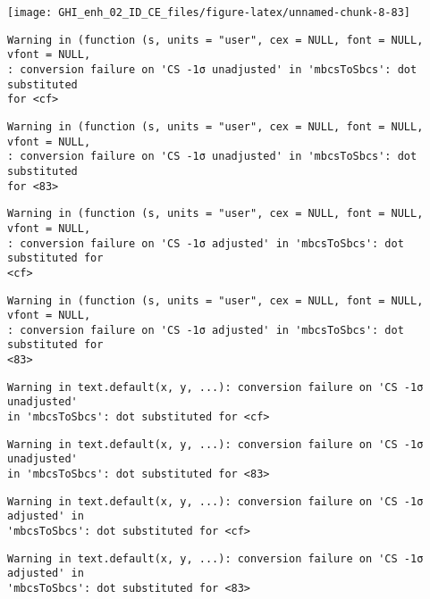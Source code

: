 \documentclass[
  10pt,
  a4paper,oneside]{article}
\begin{document}
\begin{center}\texttt{[image: GHI\_enh\_02\_ID\_CE\_files/figure-latex/unnamed-chunk-8-83]} \end{center}

\begin{verbatim}
Warning in (function (s, units = "user", cex = NULL, font = NULL, vfont = NULL,
: conversion failure on 'CS -1σ unadjusted' in 'mbcsToSbcs': dot substituted
for <cf>
\end{verbatim}

\begin{verbatim}
Warning in (function (s, units = "user", cex = NULL, font = NULL, vfont = NULL,
: conversion failure on 'CS -1σ unadjusted' in 'mbcsToSbcs': dot substituted
for <83>
\end{verbatim}

\begin{verbatim}
Warning in (function (s, units = "user", cex = NULL, font = NULL, vfont = NULL,
: conversion failure on 'CS -1σ adjusted' in 'mbcsToSbcs': dot substituted for
<cf>
\end{verbatim}

\begin{verbatim}
Warning in (function (s, units = "user", cex = NULL, font = NULL, vfont = NULL,
: conversion failure on 'CS -1σ adjusted' in 'mbcsToSbcs': dot substituted for
<83>
\end{verbatim}

\begin{verbatim}
Warning in text.default(x, y, ...): conversion failure on 'CS -1σ unadjusted'
in 'mbcsToSbcs': dot substituted for <cf>
\end{verbatim}

\begin{verbatim}
Warning in text.default(x, y, ...): conversion failure on 'CS -1σ unadjusted'
in 'mbcsToSbcs': dot substituted for <83>
\end{verbatim}

\begin{verbatim}
Warning in text.default(x, y, ...): conversion failure on 'CS -1σ adjusted' in
'mbcsToSbcs': dot substituted for <cf>
\end{verbatim}

\begin{verbatim}
Warning in text.default(x, y, ...): conversion failure on 'CS -1σ adjusted' in
'mbcsToSbcs': dot substituted for <83>
\end{verbatim}
\end{document}
